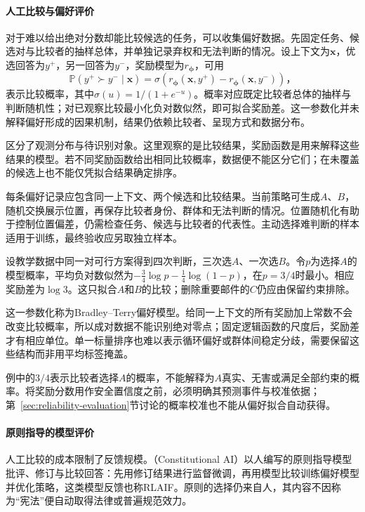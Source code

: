 \paragraph{人工比较与偏好评价}

对于难以给出绝对分数却能比较候选的任务，可以收集偏好数据。先固定任务、候选对与比较者的抽样总体，并单独记录弃权和无法判断的情况。设上下文为$\bm{x}$，优选回答为$y^+$，另一回答为$y^-$，奖励模型为$r_{\bm\phi}$，可用
\[
 \mathbb P(y^+\succ y^-\mid\bm{x})
 =\sigma\!\left(r_{\bm{\phi}}(\bm{x},y^+)
              -r_{\bm{\phi}}(\bm{x},y^-)\right)\text{，}
\]
表示比较概率，其中$\sigma(u)=1/(1+e^{-u})$。概率对应既定比较者总体的抽样与判断随机性；对已观察比较最小化负对数似然，即可拟合奖励差。这一参数化并未解释偏好形成的因果机制，结果仍依赖比较者、呈现方式和数据分布。

区分了观测分布与待识别对象。这里观察的是比较结果，奖励函数是用来解释这些结果的模型。若不同奖励函数给出相同比较概率，数据便不能区分它们；在未覆盖的候选上也不能仅凭拟合结果确定排序。

每条偏好记录应包含同一上下文、两个候选和比较结果。当前策略可生成$A$、$B$，随机交换展示位置，再保存比较者身份、群体和无法判断的情况。位置随机化有助于控制位置偏差，仍需检查任务、候选与比较者的代表性。主动选择难判断的样本适用于训练，最终验收应另取独立样本。

设教学数据中同一对可行方案得到四次判断，三次选$A$、一次选$B$。令$p$为选择$A$的模型概率，平均负对数似然为$-\tfrac34\log p-\tfrac14\log(1-p)$，在$p=3/4$时最小。相应奖励差为$\log3$。这只拟合$A$和$B$的比较；删除重要邮件的$C$仍应由保留约束排除。

这一参数化称为Bradley--Terry偏好模型。给同一上下文的所有奖励加上常数不会改变比较概率，所以成对数据不能识别绝对零点；固定逻辑函数的尺度后，奖励差才有相应单位。单一标量排序也难以表示循环偏好或群体间稳定分歧，需要保留这些结构而非用平均标签掩盖。

例中的$3/4$表示比较者选择$A$的概率，不能解释为$A$真实、无害或满足全部约束的概率。将奖励分数用作安全置信度之前，必须明确其预测事件与校准依据；第~\ref{sec:reliability-evaluation}节讨论的概率校准也不能从偏好拟合自动获得。

\paragraph{原则指导的模型评价}

人工比较的成本限制了反馈规模。（Constitutional AI）以人编写的原则指导模型批评、修订与比较回答：先用修订结果进行监督微调，再用模型比较训练偏好模型并优化策略，这类模型反馈也称RLAIF。原则的选择仍来自人，其内容不因称为“宪法”便自动取得法律或普遍规范效力。

